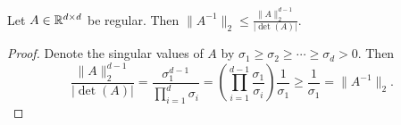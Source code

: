\begin{lemma}\label{lemma:MatrixInverseNorm}
  Let $A\in\mathbb{R}^{d\times d}$ be regular. Then
  $\|A^{-1}\|_2\le \frac{\|A\|_2^{d-1}}{|\det(A)|}$.
\end{lemma}
\begin{proof}
  Denote the singular values of $A$ by
  $\sigma_1\ge \sigma_2\ge\cdots\ge\sigma_d>0$. Then
  \begin{equation*}
    \frac{\|A\|_2^{d-1}}{|\det(A)|} =
    \frac{\sigma_1^{d-1}}{
      \prod_{i=1}^d\sigma_i} =
    \left(\prod_{i=1}^{d-1}\frac{\sigma_1}{\sigma_i}\right)\frac{1}{\sigma_1}
    \ge \frac{1}{\sigma_1} = \|A^{-1}\|_2. %
  \end{equation*}
\end{proof}




